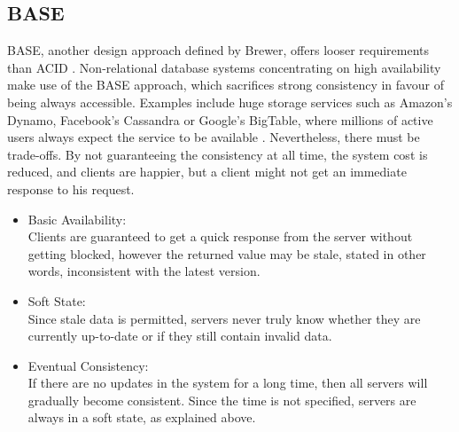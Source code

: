 \subsection{BASE}
\label{sec:background_base}
BASE, another design approach defined by Brewer, offers looser requirements than ACID \cite{brewer2012cap}. Non-relational database systems concentrating on high availability make use of the BASE approach, which sacrifices strong consistency in favour of being always accessible. Examples include huge storage services such as Amazon's Dynamo, Facebook's Cassandra or Google's BigTable, where millions of active users always expect the service to be available \cite{kalid2017big}. Nevertheless, there must be trade-offs. By not guaranteeing the consistency at all time, the system cost is reduced, and clients are happier, but a client might not get an immediate response to his request.

\begin{itemize}
  \item Basic Availability:\\
 Clients are guaranteed to get a quick response from the server without getting blocked, however the returned value may be stale, stated in other words, inconsistent with the latest version.
  \item Soft State:\\
Since stale data is permitted, servers never truly know whether they are currently up-to-date or if they still contain invalid data.
  \item Eventual Consistency:\\
If there are no updates in the system for a long time, then all servers will gradually become consistent. Since the time is not specified, servers are always in a soft state, as explained above.
\end{itemize}

    

